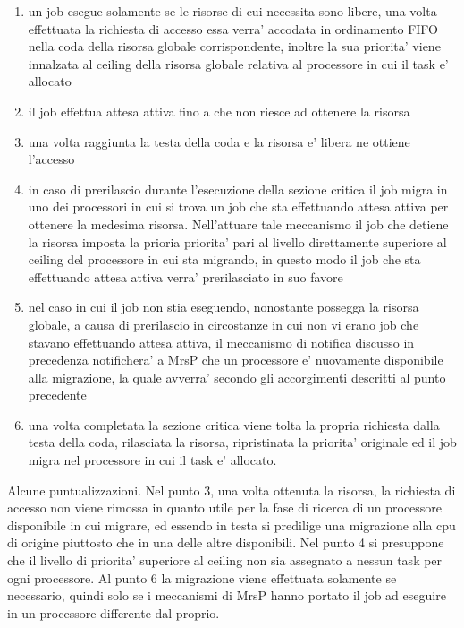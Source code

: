 \documentclass[a4paper,11pt]{article}
\begin{document}
\begin{enumerate}

\item un job esegue solamente se le risorse di cui necessita sono libere, una volta effettuata la richiesta di accesso essa verra' accodata in ordinamento FIFO nella coda della risorsa globale corrispondente, inoltre la sua priorita' viene innalzata al ceiling della risorsa globale relativa al processore in cui il task e' allocato

\item il job effettua attesa attiva fino a che non riesce ad ottenere la risorsa

\item una volta raggiunta la testa della coda e la risorsa e' libera ne ottiene l'accesso

\item in caso di prerilascio durante l'esecuzione della sezione critica il job migra in uno dei processori in cui si trova un job che sta effettuando attesa attiva per ottenere la medesima risorsa. Nell'attuare tale meccanismo il job che detiene la risorsa imposta la prioria priorita' pari al livello direttamente superiore al ceiling del processore in cui sta migrando, in questo modo il job che sta effettuando attesa attiva verra' prerilasciato in suo favore 

\item nel caso in cui il job non stia eseguendo, nonostante possegga la risorsa globale, a causa di prerilascio in circostanze in cui non vi erano job che stavano effettuando attesa attiva, il meccanismo di notifica discusso in precedenza notifichera' a MrsP che un processore e' nuovamente disponibile alla migrazione, la quale avverra' secondo gli accorgimenti descritti al punto precedente

\item una volta completata la sezione critica viene tolta la propria richiesta dalla testa della coda, rilasciata la risorsa, ripristinata la priorita' originale ed il job migra nel processore in cui il task e' allocato.

\end{enumerate}

\noindent Alcune puntualizzazioni. Nel punto 3, una volta ottenuta la risorsa, la richiesta di accesso non viene rimossa in quanto utile per la fase di ricerca di un processore disponibile in cui migrare, ed essendo in testa si predilige una migrazione alla cpu di origine piuttosto che in una delle altre disponibili. Nel punto 4 si presuppone che il livello di priorita' superiore al ceiling non sia assegnato a nessun task per ogni processore. Al punto 6 la migrazione viene effettuata solamente se necessario, quindi solo se i meccanismi di MrsP hanno portato il job ad eseguire in un processore differente dal proprio.\\
\end{document}

